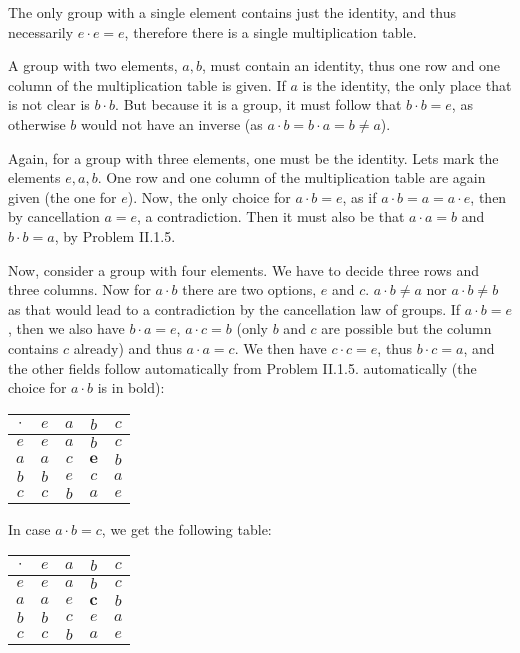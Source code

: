 \begin{solution}
	The only group with a single element contains just the identity, and thus necessarily $e \cdot e = e$, therefore there is a single multiplication table.
	
	A group with two elements, $a,b$, must contain an identity, thus one row and one column of the multiplication table is given. If $a$ is the identity, the only place that is not clear is $b \cdot b$. But because it is a group, it must follow that $b \cdot b = e$, as otherwise $b$ would not have an inverse (as $a \cdot b = b \cdot a = b \neq a$).
	
	Again, for a group with three elements, one must be the identity. Lets mark the elements $e, a, b$. One row and one column of the multiplication table are again given (the one for $e$). Now, the only choice for $a \cdot b = e$, as if $a \cdot b = a = a \cdot e$, then by cancellation $a = e$, a contradiction. Then it must also be that $a \cdot a = b$ and $b \cdot b = a$, by Problem II.1.5.
	
	Now, consider a group with four elements. We have to decide three rows and three columns. Now for $a \cdot b$ there are two options, $e$ and $c$. $a \cdot b \neq a$ nor $a \cdot b \neq b$ as that would lead to a contradiction by the cancellation law of groups. If $a \cdot b = e$, then we also have $b \cdot a = e$, $a \cdot c = b$ (only $b$ and $c$ are possible but the column contains $c$ already) and thus $a \cdot a = c$. We then have $c \cdot c = e$, thus $b \cdot c = a$, and the other fields follow automatically from Problem II.1.5. automatically (the choice for $a \cdot b$ is in bold):
	
	\begin{center}
		\begin{tabular}{c||c|c|c|c}
			$\cdot$ & $e$ & $a$ & $b$ & $c$ \\
			\hline\hline
			$e$ & $e$ & $a$ & $b$ & $c$ \\ 
			\hline
			$a$ & $a$ & $c$ & $\boldsymbol{e}$ & $b$ \\ 
			\hline
			$b$ & $b$ & $e$ & $c$ & $a$ \\ 
			\hline
			$c$ & $c$ & $b$ & $a$ & $e$ \\ 
		\end{tabular}
	\end{center}

	In case $a \cdot b = c$, we get the following table:
	
	\begin{center}
		\begin{tabular}{c||c|c|c|c}
			$\cdot$ & $e$ & $a$ & $b$ & $c$ \\
			\hline\hline
			$e$ & $e$ & $a$ & $b$ & $c$ \\ 
			\hline
			$a$ & $a$ & $e$ & $\boldsymbol{c}$ & $b$ \\ 
			\hline
			$b$ & $b$ & $c$ & $e$ & $a$ \\ 
			\hline
			$c$ & $c$ & $b$ & $a$ & $e$ \\ 
		\end{tabular}
	\end{center}
		

\end{solution}

